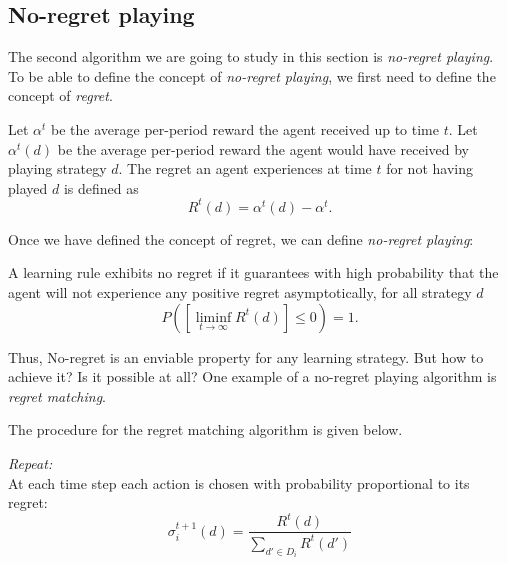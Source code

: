 \subsection{No-regret playing}
The second algorithm we are going to study in this section is \emph{no-regret
playing}. To be able to define the concept of \emph{no-regret playing}, we
first need to define the concept of \emph{regret}.

\begin{definition}[Regret]
    Let $\alpha^t$ be the average per-period reward the agent received up to time
    $t$. Let $\alpha^t(d)$ be the average per-period reward the agent would have
    received by playing strategy $d$. The regret an agent experiences at
    time $t$ for not having played $d$ is defined as
    $$R^t(d) = \alpha^t(d) - \alpha^t.$$
\end{definition}

Once we have defined the concept of regret, we can define \emph{no-regret playing}:

\begin{definition}
    A learning rule exhibits no regret if it guarantees with high probability that
    the agent will not experience any positive regret asymptotically, for all strategy $d$
    $$P([\liminf_{t\rightarrow \infty} R^t(d)] \leq 0) = 1.$$
\end{definition}

Thus, No-regret is an enviable property for any learning strategy.
But how to achieve it? Is it possible at all?
One example of a no-regret playing algorithm is \emph{regret
matching}.

The procedure for the regret matching algorithm is given below.

\begin{procedure}
    \emph{Repeat:\\}
	\quad At each time step each action is chosen with probability proportional to its regret:\\
			$$\sigma_i^{t+1}(d)= \frac{R^t(d)}{\sum_{d'\in D_i} R^t(d')}$$
    \label{chap9:regretmatchproc}
\end{procedure}



\ifx \globalmark \undefined %


	
\else

\fi
